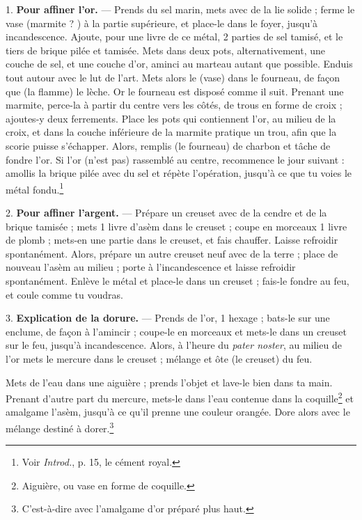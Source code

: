 \documentclass[a4paper, 11pt, oneside, polutonikogreek, french]{article}
\begin{document}
\bigskip
\centerline{\EightStarTaper}
\centerline{\EightStarTaper\EightStarTaper}
\bigskip

1. \textbf{Pour affiner l'or.} --- Prends du sel marin, mets avec de la lie solide ; ferme le vase (marmite ? ) à la partie supérieure, et place-le dans le foyer, jusqu'à incandescence. Ajoute, pour une livre de ce métal, 2 parties de sel tamisé, et le tiers de brique pilée et tamisée. Mets dans deux pots, alternativement, une couche de sel, et une couche d'or, aminci au marteau autant que possible. Enduis tout autour avec le lut de l'art. Mets alors le (vase) dans le fourneau, de façon que (la flamme) le lèche. Or le fourneau est disposé comme il suit. Prenant une marmite, perce-la à partir du centre vers les côtés, de trous en forme de croix ; ajoutes-y deux ferrements. Place les pots qui contiennent l'or, au milieu de la croix, et dans la couche inférieure de la marmite pratique un trou, afin que la scorie puisse s'échapper. Alors, remplis (le fourneau) de charbon et tâche de fondre l'or. Si l'or (n'est pas) rassemblé au centre, recommence le jour suivant : amollis la brique pilée avec du sel et répète l'opération, jusqu'à ce que tu voies le métal fondu.\footnote{Voir \emph{Introd.}, p. 15, le cément royal.}

2. \textbf{Pour affiner l'argent.} --- Prépare un creuset avec de la cendre et de la brique tamisée ; mets 1 livre d'asèm dans le creuset ; coupe en morceaux 1 livre de plomb ; mets-en une partie dans le creuset, et fais chauffer. Laisse refroidir spontanément. Alors, prépare un autre creuset neuf avec de la terre ; place de nouveau l'asèm au milieu ; porte à l'incandescence et laisse refroidir spontanément. Enlève le métal et place-le dans un creuset ; fais-le fondre au feu, et coule comme tu voudras.

3. \textbf{Explication de la dorure.} --- Prends de l'or, 1 hexage ; bats-le sur une enclume, de façon à l'amincir ; coupe-le en morceaux et mets-le dans un creuset sur le feu, jusqu'à incandescence. Alors, à l'heure du \emph{pater noster}, au milieu de l'or mets le mercure dans le creuset ; mélange et ôte (le creuset) du feu.

Mets de l'eau dans une aiguière ; prends l'objet et lave-le bien dans ta main. Prenant d'autre part du mercure, mets-le dans l'eau contenue dans la coquille\footnote{Aiguière, ou vase en forme de coquille.} et amalgame l'asèm, jusqu'à ce qu'il prenne une couleur orangée. Dore alors avec le mélange destiné à dorer.\footnote{C'est-à-dire avec l'amalgame d'or préparé plus haut.}
\end{document}
